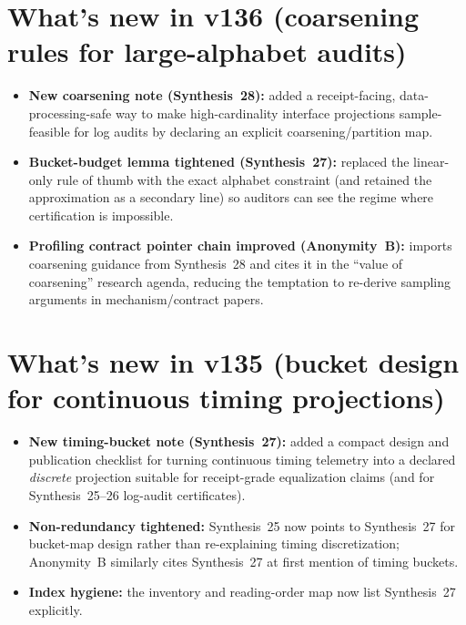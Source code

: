 \documentclass[11pt]{article}
\begin{document}
\section{What's new in v136 (coarsening rules for large-alphabet audits)}

\begin{itemize}[leftmargin=*]
\item \textbf{New coarsening note (Synthesis~28):} added a receipt-facing, data-processing-safe way to make high-cardinality interface projections sample-feasible for log audits by declaring an explicit coarsening/partition map.
\item \textbf{Bucket-budget lemma tightened (Synthesis~27):} replaced the linear-only rule of thumb with the exact alphabet constraint (and retained the approximation as a secondary line) so auditors can see the regime where certification is impossible.
\item \textbf{Profiling contract pointer chain improved (Anonymity~B):} imports coarsening guidance from Synthesis~28 and cites it in the ``value of coarsening'' research agenda, reducing the temptation to re-derive sampling arguments in mechanism/contract papers.
\end{itemize}

\section{What's new in v135 (bucket design for continuous timing projections)}

\begin{itemize}[leftmargin=*]
\item \textbf{New timing-bucket note (Synthesis~27):} added a compact design and publication checklist for turning continuous timing telemetry into a declared \emph{discrete} projection suitable for receipt-grade equalization claims (and for Synthesis~25--26 log-audit certificates).
\item \textbf{Non-redundancy tightened:} Synthesis~25 now points to Synthesis~27 for bucket-map design rather than re-explaining timing discretization; Anonymity~B similarly cites Synthesis~27 at first mention of timing buckets.
\item \textbf{Index hygiene:} the inventory and reading-order map now list Synthesis~27 explicitly.
\end{itemize}
\end{document}
